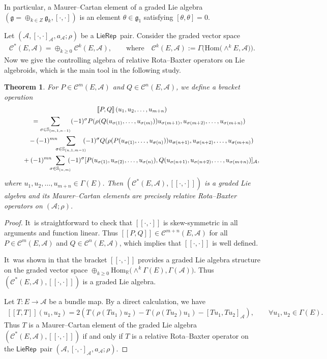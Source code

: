 \documentclass[10pt,a4paper]{amsart}
\numberwithin{equation}{section}
\newtheorem{thm}{Theorem}[section]
\newcommand{\Real}{\mathbb R}
\newcommand{\huaA}{\mathcal{A}}
\newcommand{\huaC}{\mathcal{C}}
\newcommand{\frkg}{\mathfrak g}
\newcommand{\Courant}[1]{\left[\!\left[ #1\right]\!\right]}
\newcommand{\Hom}{\mathrm{Hom}}
\newcommand{\LP}{$\mathsf{LieRep}$~}
\begin{document}
In particular, a Maurer--Cartan element of a graded Lie algebra $(\frkg=\oplus_{k\in Z} \frkg_{k},[\cdot,\cdot])$ is an element $\theta\in \frkg_{1}$ satisfying $[\theta,\theta]=0$.

Let $(\huaA,[\cdot,\cdot]_\huaA,a_\huaA;\rho)$ be a \LP pair. Consider the graded vector space
\begin{gather*}
\huaC^*(E,\huaA)=\oplus_{k\geq0}\huaC^k(E,\huaA),\qquad
\text{where}\quad\huaC^k(E,\huaA):=\Gamma\big(\Hom\big({\wedge}^{k}E,\huaA\big)\big).
\end{gather*}
Now we give the controlling algebra of relative Rota--Baxter operators on Lie algebroids, which is the main tool in the following study.
\begin{thm}\label{thm:graded Lie algebra}
	For $P\in \huaC^m(E,\huaA)$ and $Q\in \huaC^n(E,\huaA)$, we define a bracket operation
\begin{gather}
\Courant{P,Q}(u_1,u_2,\dots,u_{m+n})\nonumber
\\ \qquad
{}=\sum_{\sigma\in\mathbb{S}_{(m,1,n-1)}} (-1)^\sigma P(\rho(Q(u_{\sigma(1)},\dots,u_{\sigma(m)}))
u_{\sigma(m+1)},u_{\sigma(m+2)},\dots,u_{\sigma(m+n)})\label{eq:graded Lie bracket}
\\ \qquad\hphantom{=}
{}-(-1)^{mn}\!\!\!\sum_{\sigma\in\mathbb{S}_{(n,1,m-1)}}\!\!\! (-1)^\sigma Q(\rho(P(u_{\sigma(1)},\dots,u_{\sigma(n)}))u_{\sigma(n+1)},u_{\sigma(n+2)},\dots,u_{\sigma(m+n)})\nonumber
\\ \qquad\hphantom{=}
{}+(-1)^{mn}\!\!\!\sum_{\sigma\in\mathbb{S}_{(n,m)}} \!\!\!(-1)^\sigma [P(u_{\sigma(1)}, u_{\sigma(2)},\dots,u_{\sigma(n)}),Q(u_{\sigma(n+1)},u_{\sigma(n+2)},\dots,u_{\sigma(m+n)})]_{\huaA},
\nonumber
\end{gather}
where $ u_1,u_2,\dots,u_{m+n} \in \Gamma(E)$.
Then $(\huaC^*(E,\huaA),\Courant{\cdot,\cdot})$ is a graded Lie algebra and its Maurer--Cartan elements are precisely relative Rota--Baxter operators on $(\huaA;\rho)$.
	\end{thm}
\begin{proof}
It~is straightforward to check that $\Courant{\cdot,\cdot}$ is skew-symmetric in all arguments and function linear. Thus $\Courant{P,Q}\in\huaC^{m+n}(E,\huaA)$ for all $P\in \huaC^m(E,\huaA)$ and $Q\in \huaC^n(E,\huaA)$, which implies that
$\Courant{\cdot,\cdot}$ is well defined.


It~was shown in \cite{TBGS} that the bracket $\Courant{\cdot,\cdot}$ provides a graded Lie algebra structure on the graded vector space $\oplus_{k\geq0}\Hom_\Real\big({\wedge}^{k}\Gamma(E),\Gamma(\huaA)\big)$. Thus $(\huaC^*(E,\huaA),\Courant{\cdot,\cdot})$ is a graded Lie algebra.

Let $T\colon E\rightarrow \huaA $ be a bundle map. By a direct calculation, we have
\begin{gather*}%
\Courant{T,T}(u_1,u_2)=2(T(\rho(Tu_1)u_2)-T(\rho(Tu_2)u_1)-[Tu_1,Tu_2]_{\huaA}),\qquad
\forall u_1, u_2\in \Gamma(E).
\end{gather*}
Thus $T$ is a Maurer--Cartan element of the graded Lie algebra $(\huaC^*(E,\huaA),\Courant{\cdot,\cdot})$ if and only if $T$ is a relative Rota--Baxter operator on the \LP pair $(\huaA,[\cdot,\cdot]_\huaA,a_\huaA;\rho)$.
\end{proof}
\end{document}
